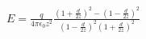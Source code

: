 \documentclass[preview]{standalone}
\begin{document}
\begin{align*}
E = \frac{q}{4\pi\epsilon_{0}z^{2}}  \frac{\left ( 1+\frac{d}{2z} \right )^{2} - \left ( 1-\frac{d}{2z} \right )^{2} }{\left ( 1-\frac{d}{2z} \right )^{2}\left ( 1+\frac{d}{2z} \right )^{2}}
\end{align*}
\end{document}
